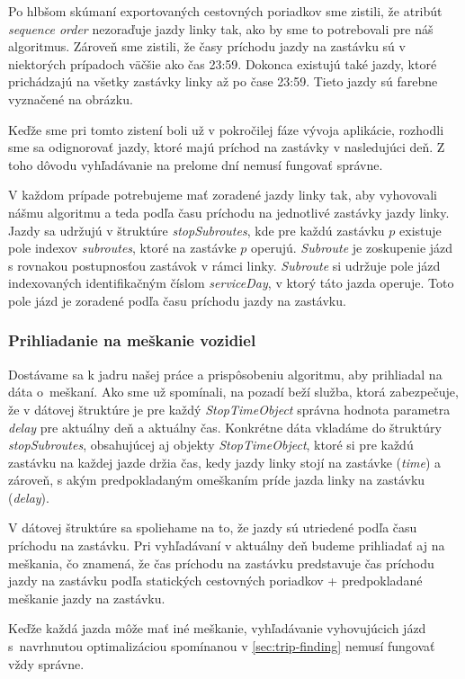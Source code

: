 Po hlbšom skúmaní exportovaných cestovných poriadkov sme zistili, že atribút \textit{sequence order} nezoraďuje jazdy linky tak, ako by sme to potrebovali pre náš algoritmus. Zároveň sme zistili, že časy príchodu jazdy na zastávku sú v niektorých prípadoch väčšie ako čas 23:59. Dokonca existujú také jazdy, ktoré prichádzajú na všetky zastávky linky až po čase 23:59. Tieto jazdy sú farebne vyznačené na obrázku.

Keďže sme pri tomto zistení boli už v pokročilej fáze vývoja aplikácie, rozhodli sme sa odignorovať jazdy, ktoré majú príchod na zastávky v nasledujúci deň. Z toho dôvodu vyhľadávanie na prelome dní nemusí fungovať správne.

V každom prípade potrebujeme mať zoradené jazdy linky tak, aby vyhovovali nášmu algoritmu a teda podľa času príchodu na jednotlivé zastávky jazdy linky. Jazdy sa udržujú v štruktúre \textit{stopSubroutes}, kde pre každú zastávku $p$ existuje pole indexov \textit{subroutes}, ktoré na zastávke $p$ operujú. \textit{Subroute} je zoskupenie jázd s rovnakou postupnosťou zastávok v rámci linky. \textit{Subroute} si udržuje pole jázd indexovaných identifikačným číslom \textit{serviceDay}, v ktorý táto jazda operuje. Toto pole jázd je zoradené podľa času príchodu jazdy na zastávku. 

\subsubsection{Prihliadanie na meškanie vozidiel}
Dostávame sa k jadru našej práce a prispôsobeniu algoritmu, aby prihliadal na dáta o~meškaní. Ako sme už spomínali, na pozadí beží služba, ktorá zabezpečuje, že v dátovej štruktúre je pre každý \textit{StopTimeObject} správna hodnota parametra \textit{delay} pre aktuálny deň a aktuálny čas. 
Konkrétne dáta vkladáme do štruktúry \textit{stopSubroutes}, obsahujúcej aj objekty \textit{StopTimeObject}, ktoré si pre každú zastávku na každej jazde držia čas, kedy jazdy linky stojí na zastávke (\textit{time}) a zároveň, s akým predpokladaným omeškaním príde jazda linky na zastávku (\textit{delay}). 

V dátovej štruktúre sa spoliehame na to, že jazdy sú utriedené podľa času príchodu na zastávku. Pri vyhľadávaní v aktuálny deň budeme prihliadať aj na meškania, čo znamená, že čas príchodu na zastávku predstavuje čas príchodu jazdy na zastávku podľa statických cestovných poriadkov + predpokladané meškanie jazdy na zastávku.

Keďže každá jazda môže mať iné meškanie, vyhľadávanie vyhovujúcich jázd s~navrhnutou optimalizáciou spomínanou v \ref{sec:trip-finding} nemusí fungovať vždy správne. 

